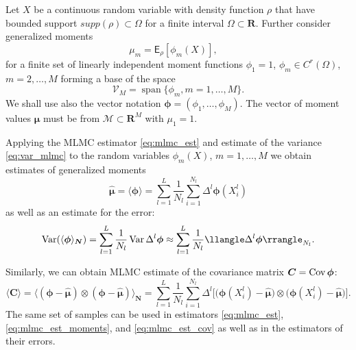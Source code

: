 \documentclass{article}
\def\vc#1{\mathbf{\boldsymbol{#1}}}     %
\def\tn#1{\boldsymbol{#1}}
\def \E{{\mathsf E}}
\def\R{\mathbf{R}}
\def\avg#1{\langle#1\rangle}
\def\var#1{\llangle#1\rrangle}
\def\Var{\mathop{\rm Var}}
\def\Cov{\mathop{\rm Cov}}
\DeclareMathOperator{\Span}{span}
\def\vmu{\vc\mu}
\def\estvmu{{\vc{\hat\mu}}}
\def\vphi{\vc\phi}
\begin{document}
Let $X$ be a continuous random variable with density function $\rho$ that have bounded support
$supp(\rho) \subset \Omega$ for a finite interval $\Omega \subset \R$. Further consider generalized moments
\begin{equation}
    \label{eq:gen_moments}
    \mu_m = \E_{\rho}[\phi_m(X)], \quad 
\end{equation}
for a finite set of linearly independent moment functions $\phi_1=1$, $\phi_m\in C^r(\Omega)$, $m=2,\dots, M$ forming a base of the space
\[
    \mathcal V_M = \Span\{\phi_m, m=1,\dots, M\}.
\] 
We shall use also the vector notation $\vphi = (\phi_1, \dots,\phi_M)$. The vector of moment values
$\vmu$ must be from $\mathcal M \subset \R^M$ with $\mu_1 = 1$.

Applying the MLMC estimator \eqref{eq:mlmc_est} and estimate of the variance \eqref{eq:var_mlmc} 
to the random variables $\phi_m(X)$, $m=1,\dots, M$ we obtain estimates of generalized moments
\begin{equation}
    \label{eq:mlmc_est_moments}
    \estvmu = \avg{\vphi} = \sum_{l=1}^L \frac{1}{N_l} \sum_{i=1}^{N_l} \Delta^l\vphi(X_i^l)
\end{equation}
as well as an estimate for the error:
\[
    \Var(\avg{\vphi}_{\vc N}) =  \sum_{l=1}^{L} \frac{1}{N_l} \Var{\Delta^l\vphi} 
    \approx \sum_{l=1}^{L} \frac{1}{N_l} \var{\Delta^l\vphi}_{N_l}.
\]

Similarly, we can obtain MLMC estimate of the covariance matrix $\tn C = \Cov{\vc\phi}$: 
\begin{equation}
    \label{eq:mlmc_est_cov}
    \avg{\tn C} = \avg{(\vphi - \estvmu)\otimes(\vphi - \estvmu)}_{\vc N} = 
    \sum_{l=1}^L \frac{1}{N_l} \sum_{i=1}^{N_l} \Delta^l\Big[ 
    \big(\vphi(X_i^l) - \estvmu\big)\otimes\big(\vphi(X_i^l) - \estvmu\big)\Big].
\end{equation}
The same set of samples can be used in estimators \eqref{eq:mlmc_est}, \eqref{eq:mlmc_est_moments}, and \eqref{eq:mlmc_est_cov} as well as in the estimators of their errors.
\end{document}
